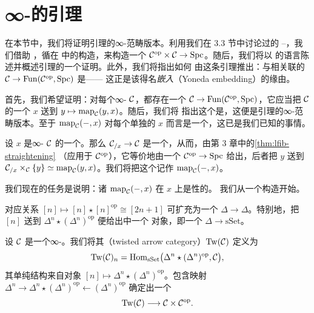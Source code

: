 \section{∞-\trCategories{}的\trYoneda{}引理}
\label{sec:yoneda-lemma}

在本节中，我们将证明\trYoneda{}引理的∞-范畴版本。利用我们在 3.3 节中讨论过的%
\trStraightening{}--\trUnstraightening{}\trEquivalence{}，我们借助%
\trTwistedArrowCategory{}，循\trLurie{}在 \cite{Lur17} 中的构造，来构造一个\trBivariant{}%
\trMappingSpace{}\trFunctor{} $\mathcal{C}^{\mathrm{op}} \times \mathcal{C} \to \mathrm{Spc}$。随后，我们将以%
\trLeftFibration{}的语言陈述并概述\trYoneda{}引理的一个证明。此外，我们将指出如何
由这条引理推出：与\trBivariant{}\trMappingSpace{}\trFunctor{}相关联的\trFunctor{}%
$\mathcal{C} \to \mathrm{Fun}(\mathcal{C}^{\mathrm{op}}, \mathrm{Spc})$ 是\trFullyFaithful{}——
这正是该\trFunctor{}得名\emph{\trYoneda{}嵌入}（Yoneda embedding）的缘由。

首先，我们希望证明：对每个∞-\trCategory{} $\mathcal{C}$，都存在一个\trYoneda{}\trFunctor{}%
$\mathcal{C} \to \mathrm{Fun}(\mathcal{C}^{\mathrm{op}}, \mathrm{Spc})$，它应当把 $\mathcal{C}$ 的一个%
\trObject{} $x$ 送到\trFunctor{} $y \mapsto \mathrm{map}_{\mathcal{C}}(y, x)$。随后，我们将
指出这个\trFunctor{}是\trFullyFaithful{}，这便是\trYoneda{}引理的∞-范畴版本。至于
$\mathrm{map}_{\mathcal{C}}(-, x)$ 对每个单独的 $x$ 而言是一个\trFunctor{}，这已是我们已知的事情。

\begin{definition}\label{def:map-functor}
设 $x$ 是∞-\trCategory{} $\mathcal{C}$ 的一个\trObject{}。那么\trFunctor{} $\mathcal{C}_{/x} \to \mathcal{C}$
是一个\trRightFibration{}，从而，由第 3 章中的\cref{thm:lfib-straightening}
（应用于 $\mathcal{C}^{\mathrm{op}}$），它等价地由一个\trFunctor{}%
$\mathcal{C}^{\mathrm{op}} \to \mathrm{Spc}$ 给出，后者把 $y$ 送到
$\mathcal{C}_{/x} \times_{\mathcal{C}} \{y\} \simeq \mathrm{map}_{\mathcal{C}}(y, x)$。我们将把这个\trFunctor{}记作
$\mathrm{map}_{\mathcal{C}}(-, x)$。
\end{definition}

我们现在的任务是说明：诸\trFunctor{} $\mathrm{map}_{\mathcal{C}}(-, x)$ 在 $x$ 上是\trFunctor{}性的。
我们从一个构造开始。

\begin{lemma}\label{lem:join-cosimplicial}
对应关系 $[n] \mapsto [n] \star [n]^{\mathrm{op}} \cong [2n+1]$ 可扩充为一个%
\trFunctor{} $\Delta \to \Delta$。特别地，把 $[n]$ 送到
$\Delta^n \star (\Delta^n)^{\mathrm{op}}$ 便给出\trSimplicialSets{}中一个%
\trCosimplicial{}对象，即一个\trFunctor{} $\Delta \to \mathrm{sSet}$。
\end{lemma}

\begin{definition}\label{def:twisted-arrow}
设 $\mathcal{C}$ 是一个∞-\trCategory{}。我们将其\emph{\trTwistedArrowCategory{}}（twisted
arrow category）$\mathrm{Tw}(\mathcal{C})$ 定义为\trSimplicialSet{}%
\[
\mathrm{Tw}(\mathcal{C})_n
  = \mathrm{Hom}_{\mathrm{sSet}}\bigl(\Delta^n \star (\Delta^n)^{\mathrm{op}}, \mathcal{C}\bigr),
\]
其单纯结构来自\trCosimplicial{}对象
$[n] \mapsto \Delta^n \star (\Delta^n)^{\mathrm{op}}$。包含映射
$\Delta^n \to \Delta^n \star (\Delta^n)^{\mathrm{op}} \leftarrow (\Delta^n)^{\mathrm{op}}$
确定出一个\trFunctor{}%
\[
\mathrm{Tw}(\mathcal{C}) \longrightarrow \mathcal{C} \times \mathcal{C}^{\mathrm{op}}.
\]
\end{definition}

